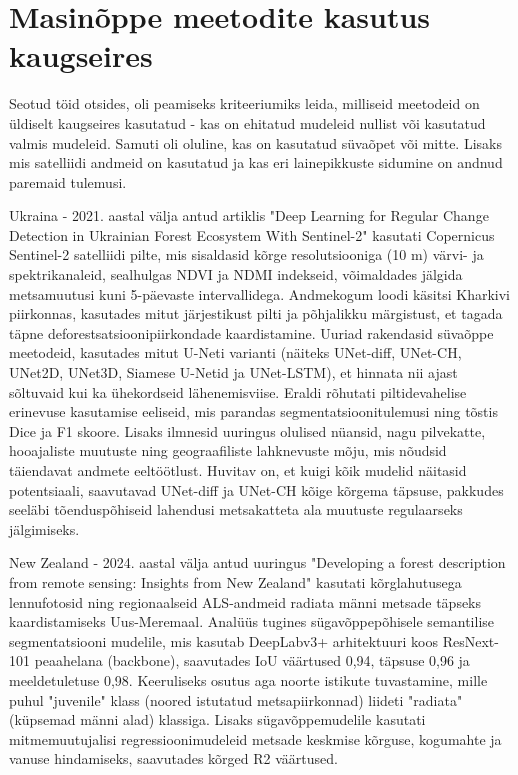 \section{Masinõppe meetodite kasutus kaugseires}
Seotud töid otsides, oli peamiseks kriteeriumiks leida, milliseid meetodeid on
üldiselt kaugseires kasutatud - kas on ehitatud mudeleid nullist või kasutatud
valmis mudeleid. Samuti oli oluline, kas on kasutatud süvaõpet või mitte. Lisaks mis satelliidi andmeid on kasutatud ja kas eri lainepikkuste sidumine on andnud paremaid tulemusi.

Ukraina - 2021. aastal välja antud artiklis "Deep Learning for Regular Change
Detection in Ukrainian Forest Ecosystem With Sentinel-2" kasutati Copernicus Sentinel-2 satelliidi pilte, mis sisaldasid kõrge resolutsiooniga (10 m) värvi- ja spektrikanaleid, sealhulgas NDVI ja NDMI indekseid, võimaldades jälgida metsamuutusi kuni 5-päevaste intervallidega. Andmekogum loodi käsitsi Kharkivi piirkonnas, kasutades mitut järjestikust pilti ja põhjalikku märgistust, et tagada täpne deforestsatsioonipiirkondade kaardistamine. Uuriad rakendasid süvaõppe meetodeid, kasutades mitut U-Neti varianti (näiteks UNet-diff, UNet-CH, UNet2D, UNet3D, Siamese U-Netid ja UNet-LSTM), et hinnata nii ajast sõltuvaid kui ka ühekordseid lähenemisviise. Eraldi rõhutati piltidevahelise erinevuse kasutamise eeliseid, mis parandas segmentatsioonitulemusi ning tõstis Dice ja F1 skoore. Lisaks ilmnesid uuringus olulised nüansid, nagu pilvekatte, hooajaliste muutuste ning geograafiliste lahknevuste mõju, mis nõudsid täiendavat andmete eeltöötlust. Huvitav on, et kuigi kõik mudelid näitasid potentsiaali, saavutavad UNet-diff ja UNet-CH kõige kõrgema täpsuse, pakkudes seeläbi tõenduspõhiseid lahendusi metsakatteta ala muutuste regulaarseks jälgimiseks. \cite{isaienkovDeepLearningRegular2021}

New Zealand - 2024. aastal välja antud uuringus "Developing a forest description from remote sensing: Insights from
New Zealand" kasutati kõrglahutusega lennufotosid ning regionaalseid ALS-andmeid radiata männi metsade täpseks kaardistamiseks Uus-Meremaal. Analüüs tugines sügavõppepõhisele semantilise segmentatsiooni mudelile, mis kasutab DeepLabv3+ arhitektuuri koos ResNext-101 peaahelana (backbone), saavutades IoU väärtused 0,94, täpsuse 0,96 ja meeldetuletuse 0,98. Keeruliseks osutus aga noorte istikute tuvastamine, mille puhul "juvenile" klass (noored istutatud metsapiirkonnad) liideti "radiata" (küpsemad männi alad) klassiga. Lisaks sügavõppemudelile kasutati mitmemuutujalisi regressioonimudeleid metsade keskmise kõrguse, kogumahte ja vanuse hindamiseks, saavutades kõrged R2 väärtused. \cite{pearseDevelopingForestDescription2025}